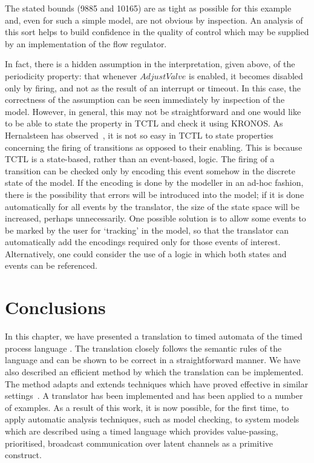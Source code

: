 The stated bounds (9885 and 10165) are as tight as possible for this
example and, even for such a simple model, are not obvious by
inspection. An analysis of this sort helps to build confidence in the
quality of control which may be supplied by an implementation of the
flow regulator.

In fact, there is a hidden assumption in the interpretation, given
above, of the periodicity property: that whenever $AdjustValve$ is
enabled, it becomes disabled only by firing, and not as the result of
an interrupt or timeout. In this case, the correctness of the
assumption can be seen immediately by inspection of the
model. However, in general, this may not be straightforward and one
would like to be able to state the property in TCTL and check it using
KRONOS. As Hernalsteen has observed~\cite{her:98}, it is not so easy
in TCTL to state properties concerning the firing of transitions as
opposed to their enabling.  This is because TCTL is a state-based,
rather than an event-based, logic.  The firing of a transition can be
checked only by encoding this event somehow in the discrete state of
the model. If the encoding is done by the modeller in an ad-hoc
fashion, there is the possibility that errors will be introduced into
the model; if it is done automatically for all events by the
translator, the size of the state space will be increased, perhaps
unnecessarily. One possible solution is to allow some events to be
marked by the user for `tracking' in the model, so that the translator
can automatically add the encodings required only for those events of
interest. Alternatively, one could consider the use of a logic in
which both states and events can be referenced.

\section{Conclusions}\label{sec:tgconc}
In this chapter, we have presented a translation to timed automata of
the timed process language \bcandle. The translation closely follows
the semantic rules of the language and can be shown to be correct in a
straightforward manner. We have also described an efficient method by
which the translation can be implemented. The method adapts and
extends techniques which have proved effective in similar
settings~\cite{gar:92,yov:93}. A translator has been implemented and
has been applied to a number of examples. As a result of this work, it
is now possible, for the first time, to apply automatic analysis
techniques, such as model checking, to system models which are
described using a timed language which provides value-passing,
prioritised, broadcast communication over latent channels as a primitive
construct. 












